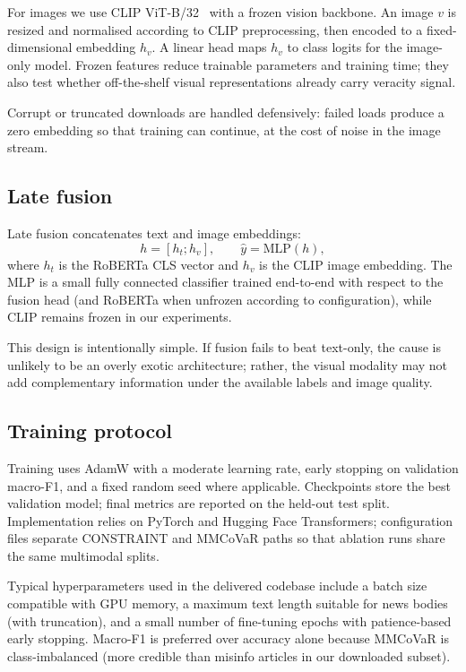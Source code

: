 \documentclass[12pt, a4paper]{report}
\begin{document}
For images we use CLIP ViT-B/32~\cite{radford2021clip} with a frozen vision backbone.
An image $v$ is resized and normalised according to CLIP preprocessing, then encoded to a fixed-dimensional embedding $h_v$.
A linear head maps $h_v$ to class logits for the image-only model.
Frozen features reduce trainable parameters and training time; they also test whether off-the-shelf visual representations already carry veracity signal.

Corrupt or truncated downloads are handled defensively: failed loads produce a zero embedding so that training can continue, at the cost of noise in the image stream.

\subsection{Late fusion}

Late fusion concatenates text and image embeddings:
\begin{equation}
h = [h_t; h_v], \qquad
\hat{y} = \mathrm{MLP}(h),
\end{equation}
where $h_t$ is the RoBERTa CLS vector and $h_v$ is the CLIP image embedding.
The MLP is a small fully connected classifier trained end-to-end with respect to the fusion head (and RoBERTa when unfrozen according to configuration), while CLIP remains frozen in our experiments.

This design is intentionally simple.
If fusion fails to beat text-only, the cause is unlikely to be an overly exotic architecture; rather, the visual modality may not add complementary information under the available labels and image quality.

\subsection{Training protocol}

Training uses AdamW with a moderate learning rate, early stopping on validation macro-F1, and a fixed random seed where applicable.
Checkpoints store the best validation model; final metrics are reported on the held-out test split.
Implementation relies on PyTorch and Hugging Face Transformers; configuration files separate CONSTRAINT and MMCoVaR paths so that ablation runs share the same multimodal splits.

Typical hyperparameters used in the delivered codebase include a batch size compatible with GPU memory, a maximum text length suitable for news bodies (with truncation), and a small number of fine-tuning epochs with patience-based early stopping.
Macro-F1 is preferred over accuracy alone because MMCoVaR is class-imbalanced (more credible than misinfo articles in our downloaded subset).
\end{document}
